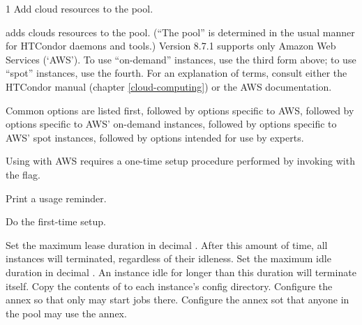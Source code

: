 \begin{ManPage}{\label{man-condor-annex}}{1}
{Add cloud resources to the pool.}

\Synopsis

 

 

 

 

\Description

 adds clouds resources to the pool.  (``The pool'' is determined
in the usual manner for HTCondor daemons and tools.)  Version 8.7.1 supports
only Amazon Web Services (`AWS').  To use ``on-demand'' instances, use
the third form above; to use ``spot'' instances, use the fourth.  For an
explanation of terms, consult either the HTCondor manual
(chapter \ref{cloud-computing}) or the AWS documentation.

Common options are listed first, followed by options specific to AWS,
followed by options specific to AWS' on-demand instances, followed by
options specific to AWS' spot instances, followed by options intended
for use by experts.

Using  with AWS requires a one-time setup procedure
performed by invoking  with the  flag.

\begin{Options}
		{Print a usage reminder.}

		{Do the first-time setup.}

		{Set the maximum lease duration in decimal .  After this amount of time, all instances will terminated, regardless of their idleness.}
		{Set the maximum idle duration in decimal .  An instance idle for longer than this duration will terminate itself. }
		{Copy the contents of  to each instance's config directory.}
		{Configure the annex so that only  may start jobs there.}
		{Configure the annex sot that anyone in the pool may use the annex.}


\end{Options}
\end{ManPage}
